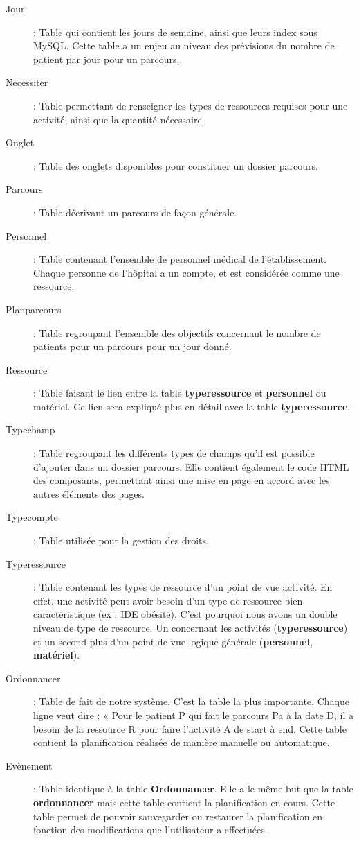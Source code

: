 \documentclass[noposter]{polytech/polytech}
\begin{document}
\begin{description}
	\item[Jour] : Table qui contient les jours de semaine, ainsi que leurs index sous MySQL. Cette table a un enjeu au niveau des prévisions du nombre de patient par jour pour un parcours.
	\item[Necessiter] : Table permettant de renseigner les types de ressources requises pour une activité, ainsi que la quantité nécessaire.
	\item[Onglet] : Table des onglets disponibles pour constituer un dossier parcours.
	\item[Parcours]	 : Table décrivant un parcours de façon générale.
	\item[Personnel] : Table contenant l'ensemble de personnel médical de l'établissement. Chaque personne de l'hôpital a un compte, et est considérée comme une ressource.
	\item[Planparcours] : Table regroupant l'ensemble des objectifs concernant le nombre de patients pour un parcours pour un jour donné.
	\item[Ressource] : Table faisant le lien entre la table \textbf{typeressource} et \textbf{personnel} ou matériel. Ce lien sera expliqué plus en détail avec la table \textbf{typeressource}.
	\item[Typechamp] : Table regroupant les différents types de champs qu'il est possible d'ajouter dans un dossier parcours. Elle contient également le code HTML des composants, permettant ainsi une mise en page en accord avec les autres éléments des pages.
	\item[Typecompte] : Table utilisée pour la gestion des droits.
	\item[Typeressource] : Table contenant les types de ressource d'un point de vue activité. En effet, une activité peut avoir besoin d'un type de ressource bien caractéristique (ex : IDE obésité). C'est pourquoi nous avons un double niveau de type de ressource. Un concernant les activités (\textbf{typeressource}) et un second plus d'un point de vue logique générale (\textbf{personnel}, \textbf{matériel}).
	\item[Ordonnancer] : Table de fait de notre système. C'est la table la plus importante. Chaque ligne veut dire : « Pour le patient P qui fait le parcours Pa à la date D, il a besoin de la ressource R pour faire l'activité A de start à end. Cette table contient la planification réalisée de manière manuelle ou automatique.
	\item[Evènement] : Table identique à la table \textbf{Ordonnancer}. Elle a le même but que la table \textbf{ordonnancer} mais cette table contient la planification en cours. Cette table permet de pouvoir sauvegarder ou restaurer la planification en fonction des modifications que l'utilisateur a effectuées.
\end{description}
\end{document}
